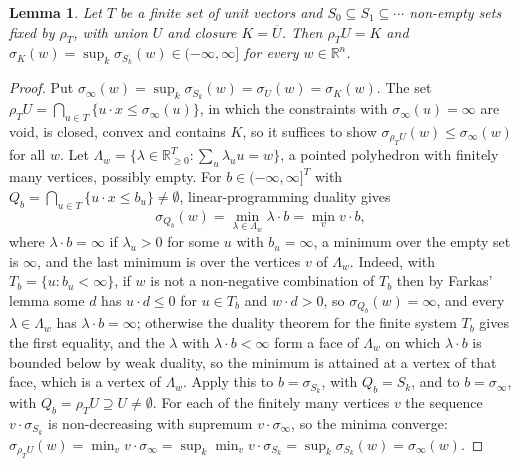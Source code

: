 \documentclass[11pt]{amsart}
\newtheorem{lem}[thm]{Lemma}
\theoremstyle{definition}
\begin{document}
\begin{lem}\label{lem:limit}
Let $T$ be a finite set of unit vectors and $S_0\subseteq S_1\subseteq
\cdots$ non-empty sets fixed by $\rho_T$, with union $U$ and closure
$K=\overline U$. Then $\rho_TU=K$ and $\sigma_K(w)=\sup_k\sigma_{S_k}
(w)\in(-\infty,\infty]$ for every $w\in\mathbb R^n$.
\end{lem}
\begin{proof}
Put $\sigma_\infty(w)=\sup_k\sigma_{S_k}(w)=\sigma_U(w)=\sigma_K(w)$.
The set $\rho_TU=\bigcap_{u\in T}\{u\cdot x\le\sigma_\infty(u)\}$, in
which the constraints with $\sigma_\infty(u)=\infty$ are void, is
closed, convex and contains $K$, so it suffices to show $\sigma_{\rho_T
U}(w)\le\sigma_\infty(w)$ for all $w$. Let $\Lambda_w=\{\lambda\in
\mathbb R^T_{\ge0}:\sum_u\lambda_uu=w\}$, a pointed polyhedron with
finitely many vertices, possibly empty. For $b\in(-\infty,\infty]^T$
with $Q_b=\bigcap_{u\in T}\{u\cdot x\le b_u\}\ne\emptyset$,
linear-programming duality \cite[Ch.~7]{Schrijver} gives
\[
\sigma_{Q_b}(w)=\min_{\lambda\in\Lambda_w}\lambda\cdot b=\min_v v\cdot
b,
\]
where $\lambda\cdot b=\infty$ if $\lambda_u>0$ for some $u$ with $b_u=
\infty$, a minimum over the empty set is $\infty$, and the last minimum
is over the vertices $v$ of $\Lambda_w$. Indeed, with $T_b=\{u:b_u<
\infty\}$, if $w$ is not a non-negative combination of $T_b$ then by
Farkas' lemma some $d$ has $u\cdot d\le0$ for $u\in T_b$ and $w\cdot d
>0$, so $\sigma_{Q_b}(w)=\infty$, and every $\lambda\in\Lambda_w$ has
$\lambda\cdot b=\infty$; otherwise the duality theorem for the finite
system $T_b$ gives the first equality, and the $\lambda$ with $\lambda
\cdot b<\infty$ form a face of $\Lambda_w$ on which $\lambda\cdot b$ is
bounded below by weak duality, so the minimum is attained at a vertex
of that face, which is a vertex of $\Lambda_w$. Apply this to $b=
\sigma_{S_k}$, with $Q_b=S_k$, and to $b=\sigma_\infty$, with $Q_b=
\rho_TU\supseteq U\ne\emptyset$. For each of the finitely many
vertices $v$ the sequence $v\cdot\sigma_{S_k}$ is non-decreasing with
supremum $v\cdot\sigma_\infty$, so the minima converge:
$\sigma_{\rho_TU}(w)=\min_vv\cdot\sigma_\infty=\sup_k\min_vv\cdot
\sigma_{S_k}=\sup_k\sigma_{S_k}(w)=\sigma_\infty(w)$.
\end{proof}
\end{document}
